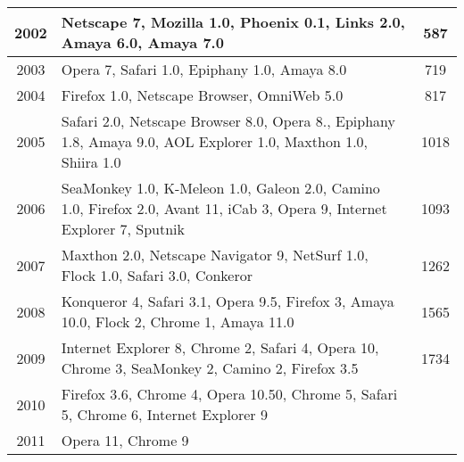 \begin{longtable}{||c|p{}|c||}
\hline
2002 & Netscape 7, Mozilla 1.0, Phoenix 0.1, Links 2.0, Amaya 6.0, Amaya 7.0 & 587 \\
\hline
2003 & Opera 7, Safari 1.0, Epiphany 1.0, Amaya 8.0 & 719 \\
\hline
2004 & Firefox 1.0, Netscape Browser, OmniWeb 5.0 & 817 \\
\hline
2005 & Safari 2.0, Netscape Browser 8.0, Opera 8., Epiphany 1.8, Amaya 9.0, AOL Explorer 1.0, Maxthon 1.0, Shiira 1.0 & 1018 \\
\hline
2006 & SeaMonkey 1.0, K-Meleon 1.0, Galeon 2.0, Camino 1.0, Firefox 2.0, Avant 11, iCab 3, Opera 9, Internet Explorer 7, Sputnik & 1093 \\
\hline
2007 & Maxthon 2.0, Netscape Navigator 9, NetSurf 1.0, Flock 1.0, Safari 3.0, Conkeror & 1262 \\
\hline
2008 & Konqueror 4, Safari 3.1, Opera 9.5, Firefox 3, Amaya 10.0, Flock 2, Chrome 1, Amaya 11.0 & 1565 \\
\hline
2009 & Internet Explorer 8, Chrome 2, Safari 4, Opera 10, Chrome 3, SeaMonkey 2, Camino 2, Firefox 3.5 & 1734 \\
\hline
2010 & Firefox 3.6, Chrome 4, Opera 10.50, Chrome 5, Safari 5, Chrome 6, Internet Explorer 9 &  \\
\hline
2011 & Opera 11, Chrome 9 & \\
\hline
\end{longtable}


